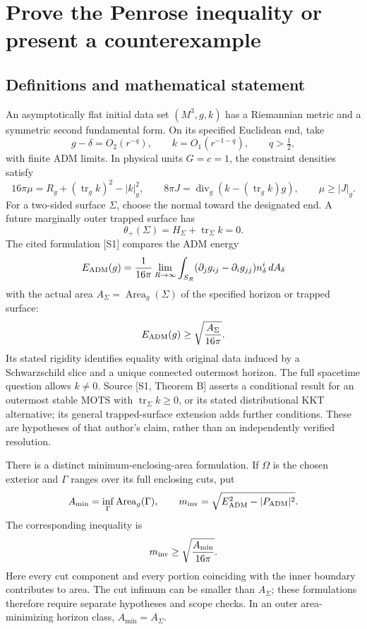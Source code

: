\documentclass[11pt]{article}
\begin{document}
\section*{\texorpdfstring{Prove the Penrose inequality or present a counterexample}{Prove the Penrose inequality or present a counterexample}}\label{30006689}
\subsection{Definitions and mathematical statement}
An asymptotically flat initial data set \((M^3,g,k)\) has a Riemannian metric and a symmetric second fundamental form. On its specified Euclidean end, take
\[
g-\delta=O_2(r^{-q}),\qquad k=O_1(r^{-1-q}),\qquad q>\tfrac12,
\]
with finite ADM limits. In physical units \(G=c=1\), the constraint densities satisfy
\[
16\pi\mu=R_g+(\operatorname{tr}_gk)^2-|k|_g^2,
\qquad8\pi J=\operatorname{div}_g(k-(\operatorname{tr}_gk)g),
\qquad\mu\ge|J|_g.
\]
For a two-sided surface \(\Sigma\), choose the normal toward the designated end. A future marginally outer trapped surface has
\[
\theta_+(\Sigma)=H_\Sigma+\operatorname{tr}_\Sigma k=0.
\]
The cited formulation [S1] compares the ADM energy
\[
E_{\rm ADM}(g)=\frac{1}{16\pi}\lim_{R\to\infty}\int_{S_R}
(\partial_jg_{ij}-\partial_i g_{jj})n_\delta^i\,dA_\delta
\]
with the actual area \(A_\Sigma=\operatorname{Area}_g(\Sigma)\) of the specified horizon or trapped surface:
\[
E_{\rm ADM}(g)\ge\sqrt{\frac{A_\Sigma}{16\pi}}.
\]
Its stated rigidity identifies equality with original data induced by a Schwarzschild slice and a unique connected outermost horizon. The full spacetime question allows \(k\ne0\). Source [S1, Theorem B] asserts a conditional result for an outermost stable MOTS with \(\operatorname{tr}_\Sigma k\ge0\), or its stated distributional KKT alternative; its general trapped-surface extension adds further conditions. These are hypotheses of that author's claim, rather than an independently verified resolution.

There is a distinct minimum-enclosing-area formulation. If \(\Omega\) is the chosen exterior and \(\Gamma\) ranges over its full enclosing cuts, put
\[
A_{\min}=\inf_\Gamma\operatorname{Area}_g(\Gamma),\qquad
m_{\rm inv}=\sqrt{E_{\rm ADM}^2-|P_{\rm ADM}|^2}.
\]
The corresponding inequality is
\[
m_{\rm inv}\ge\sqrt{\frac{A_{\min}}{16\pi}}.
\]
Here every cut component and every portion coinciding with the inner boundary contributes to area. The cut infimum can be smaller than \(A_\Sigma\); these formulations therefore require separate hypotheses and scope checks. In an outer area-minimizing horizon class, \(A_{\min}=A_\Sigma\).
\end{document}
